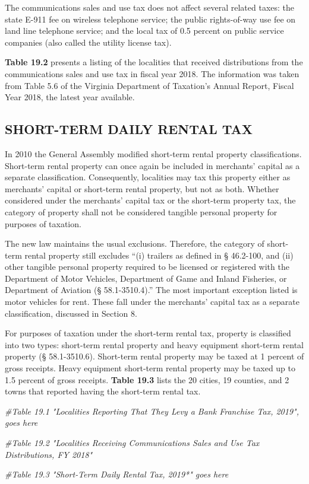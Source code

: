 \documentclass[
]{book}
\newenvironment{Shaded}{\begin{snugshade}}{\end{snugshade}}
\newcommand{\CommentTok}[1]{\textcolor[rgb]{0.56,0.35,0.01}{\textit{#1}}}
\begin{document}
The communications sales and use tax does not affect several related taxes: the state E-911 fee on wireless telephone service; the public rights-of-way use fee on land line telephone service; and the local tax of 0.5 percent on public service companies (also called the utility license tax).

\textbf{Table 19.2} presents a listing of the localities that received distributions from the communications sales and use tax in fiscal year 2018. The information was taken from Table 5.6 of the Virginia Department of Taxation's Annual Report, Fiscal Year 2018, the latest year available.

\hypertarget{short-term-daily-rental-tax}{%
\subsection{SHORT-TERM DAILY RENTAL TAX}\label{short-term-daily-rental-tax}}

In 2010 the General Assembly modified short-term rental property classifications. Short-term rental property can once again be included in merchants' capital as a separate classification. Consequently, localities may tax this property either as merchants' capital or short-term rental property, but not as both. Whether considered under the merchants' capital tax or the short-term property tax, the category of property shall not be considered tangible personal property for purposes of taxation.

The new law maintains the usual exclusions. Therefore, the category of short-term rental property still excludes ``(i) trailers as defined in § 46.2-100, and (ii) other tangible personal property required to be licensed or registered with the Department of Motor Vehicles, Department of Game and Inland Fisheries, or Department of Aviation (§ 58.1-3510.4).'' The most important exception listed is motor vehicles for rent. These fall under the merchants' capital tax as a separate classification, discussed in Section 8.

For purposes of taxation under the short-term rental tax, property is classified into two types: short-term rental property and heavy equipment short-term rental property (§ 58.1-3510.6). Short-term rental property may be taxed at 1 percent of gross receipts. Heavy equipment short-term rental property may be taxed up to 1.5 percent of gross receipts. \textbf{Table 19.3} lists the 20 cities, 19 counties, and 2 towns that reported having the short-term rental tax.

\begin{Shaded}
\begin{Highlighting}[]
\CommentTok{\#Table 19.1 "Localities Reporting That They Levy a Bank Franchise Tax, 2019", goes here}

\CommentTok{\#Table 19.2 "Localities Receiving Communications Sales and Use Tax Distributions, FY 2018"}

\CommentTok{\#Table 19.3 "Short{-}Term Daily Rental Tax, 2019*" goes here}
\end{Highlighting}
\end{Shaded}
\end{document}
